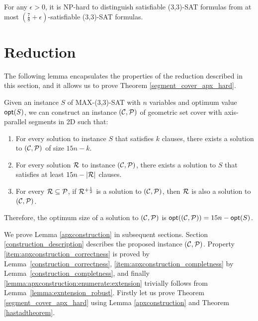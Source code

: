 \begin{tw}{
	\label{hastadtheorem}
	For any $\epsilon > 0$, it is NP-hard to distinguish satisfiable
	\linebreak
	(3,3)-SAT formulas from
	at most
	\mbox{$(\frac{7}{8} + \epsilon)$-satisfiable}
	(3,3)-SAT formulas.
}\end{tw}

\section{Reduction}

The following lemma encapsulates the properties
of the reduction described in this section,
and it allows us to prove Theorem \ref{segment_cover_apx_hard}.

\begin{lemma}{
	\label{apxconstruction}
	Given an instance $S$ of MAX-(3,3)-SAT 
	with $n$ variables and optimum value $\mathsf{opt}(S)$,
	we can construct an instance $(\mathcal{C}, \mathcal{P})$ of geometric set cover with
	axis-parallel segments in 2D such that:
	\begin{enumerate}[label={(\arabic*)}]
	\item \label{item:apxconstruction_correctness}
	For every solution to instance $S$ that satisfies $k$ clauses,
	there exists a solution to $(\mathcal{C}, \mathcal{P})$ of size $15n - k$.
	
	\item \label{item:apxconstruction_completness}
	For every solution $\mathcal{R}$ to instance $(\mathcal{C}, \mathcal{P})$,
	there exists a solution to $S$ that satisfies at least  $15n - |\mathcal{R}|$
	clauses.
	
	\item \label{lemma:apxconstruction:enumerate:extension}
	For every $\mathcal{R} \subseteq \mathcal{P}$, if $\mathcal{R}^{+\frac{1}{2}}$
	is a solution to $(\mathcal{C}, \mathcal{P})$, then $\mathcal{R}$
	is also a solution to $(\mathcal{C}, \mathcal{P})$.
\end{enumerate}
Therefore, the optimum size of a solution to $(\mathcal{C}, \mathcal{P})$
is $\mathsf{opt}((\mathcal{C}, \mathcal{P})) = 15n - \mathsf{opt}(S)$. 
	
}\end{lemma}

We prove Lemma \ref{apxconstruction} in
subsequent sections. Section \ref{construction_description}
describes the proposed instance $(\mathcal{C}, \mathcal{P})$.
Property \ref{item:apxconstruction_correctness} is proved by Lemma~\ref{construction_correctness},
\ref{item:apxconstruction_completness} by Lemma~\ref{construction_completness},
and finally \ref{lemma:apxconstruction:enumerate:extension} trivially
follows from Lemma~\ref{lemma:exntension_robust}.
Firstly let us prove
Theorem \ref{segment_cover_apx_hard} using Lemma \ref{apxconstruction}
and Theorem \ref{hastadtheorem}.

